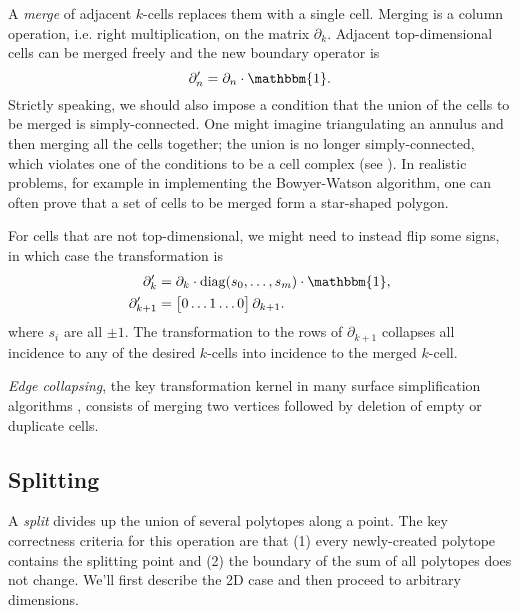 \documentclass[twocolumn]{article}
\begin{document}
A \emph{merge} of adjacent $k$-cells replaces them with a single cell.
Merging is a column operation, i.e. right multiplication, on the matrix $\partial_k$.
Adjacent top-dimensional cells can be merged freely and the new boundary operator is
\begin{equation}
    \partial_n' = \partial_n\cdot\mathbbm{1}.
\end{equation}
Strictly speaking, we should also impose a condition that the union of the cells to be merged is simply-connected.
One might imagine triangulating an annulus and then merging all the cells together; the union is no longer simply-connected, which violates one of the conditions to be a cell complex (see \cite{hatcher2002algebraic}).
In realistic problems, for example in implementing the Bowyer-Watson algorithm, one can often prove that a set of cells to be merged form a star-shaped polygon.

For cells that are not top-dimensional, we might need to instead flip some signs, in which case the transformation is
\begin{align}
    \partial_k' & = \partial_k\cdot\text{diag}(s_0, \ldots, s_m)\cdot\mathbbm{1}, \\
    \partial_{k + 1}' & = \left[\begin{matrix} 0 \ldots 1 \ldots 0\end{matrix}\right]\partial_{k + 1}.
\end{align}
where $s_i$ are all $\pm 1$.
The transformation to the rows of $\partial_{k + 1}$ collapses all incidence to any of the desired $k$-cells into incidence to the merged $k$-cell.

\emph{Edge collapsing}, the key transformation kernel in many surface simplification algorithms \cite{gueziec1995surface}, consists of merging two vertices followed by deletion of empty or duplicate cells.

\subsection{Splitting}

A \emph{split} divides up the union of several polytopes along a point.
The key correctness criteria for this operation are that (1) every newly-created polytope contains the splitting point and (2) the boundary of the sum of all polytopes does not change.
We'll first describe the 2D case and then proceed to arbitrary dimensions.
\end{document}
